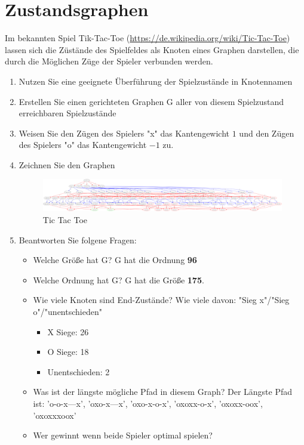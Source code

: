 \documentclass[a4paper,11pt]{report}
\begin{document}
\chapter{Zustandsgraphen}
Im bekannten Spiel Tik-Tac-Toe (\url{https://de.wikipedia.org/wiki/Tic-Tac-Toe}) lassen sich die Züstände des Spielfeldes als Knoten eines Graphen darstellen, die durch die Möglichen Züge der Spieler verbunden werden.
\begin{enumerate}
    \item Nutzen Sie eine geeignete Überführung der Spielzustände in Knotennamen 
    \item Erstellen Sie einen gerichteten Graphen G aller von diesem Spielzustand erreichbaren Spielzustände
    \item Weisen Sie den Zügen des Spielers "x" das Kantengewicht $1$ und den Zügen des Spielers "o" das Kantengewicht $-1$ zu.
    \item Zeichnen Sie den Graphen
    
    \begin{figure}[htbp]
        \centering
        \includegraphics[width=\textwidth]{notebook/assets/aufgabe_06_tictactoe.png}
        \caption{Tic Tac Toe}
        \label{fig:tictactoe}
    \end{figure}

    \item Beantworten Sie folgene Fragen:
    \begin{itemize}
        \item Welche Größe hat G?
        G hat die Ordnung \textbf{96}
        \item Welche Ordnung hat G?
        G hat die Größe \textbf{175}.
        \item Wie viele Knoten sind End-Zustände? Wie viele davon: "Sieg x"/"Sieg o"/"unentschieden"
        \begin{itemize}
            \item X Siege: 26
            \item O Siege: 18
            \item Unentschieden: 2
        \end{itemize}
        \item Was ist der längste mögliche Pfad in diesem Graph?
        Der Längste Pfad ist: 'o-o-x---x', 'oxo-x---x', 'oxo-x-o-x', 'oxoxx-o-x', 'oxoxx-oox', 'oxoxxxoox'
        \item Wer gewinnt wenn beide Spieler optimal spielen?
    \end{itemize}
\end{enumerate}
\end{document}
